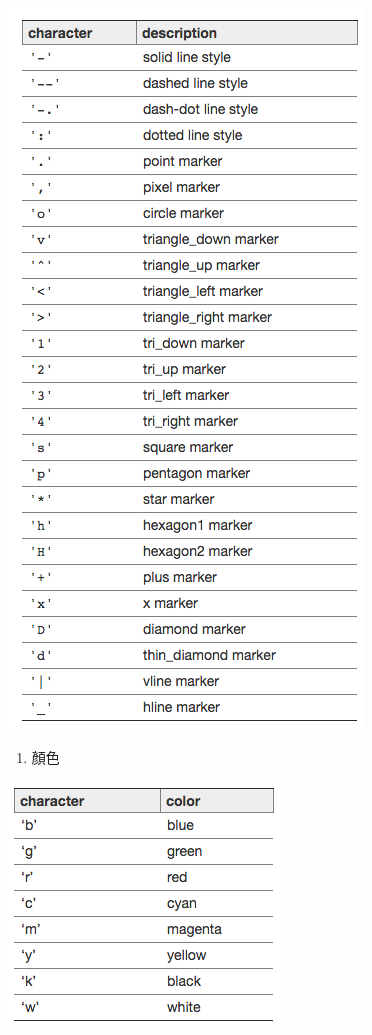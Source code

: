 \documentclass[11pt]{ctexart}
\makeatletter
\def\maxwidth{\ifdim\Gin@nat@width>\linewidth\linewidth
    \else\Gin@nat@width\fi}
\let\Oldincludegraphics\includegraphics
\renewcommand{\includegraphics}[1]{\Oldincludegraphics[width=.8\maxwidth]{#1}}
\providecommand{\tightlist}{%
      \setlength{\itemsep}{0pt}\setlength{\parskip}{0pt}}
\makeatother
\begin{document}
\includegraphics{style.png}

\begin{enumerate}
\def\labelenumi{\arabic{enumi}.}
\setcounter{enumi}{1}
\tightlist
\item
  顏色
\end{enumerate}

\includegraphics{color.png}
\end{document}

